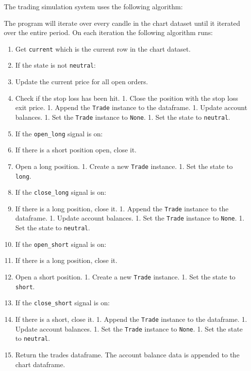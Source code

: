 \documentclass[11pt]{article}
\begin{document}
    The trading simulation system uses the following algorithm:

The program will iterate over every candle in the chart dataset until it
iterated over the entire period. On each iteration the following
algorithm runs:

\begin{enumerate}
\def\labelenumi{\arabic{enumi}.}
\item
  Get \texttt{current} which is the current row in the chart dataset.
\item
  If the state is not \texttt{neutral}:
\item
  Update the current price for all open orders.
\item
  Check if the stop loss has been hit. 1. Close the position with the
  stop loss exit price. 1. Append the \texttt{Trade} instance to the
  dataframe. 1. Update account balances. 1. Set the \texttt{Trade}
  instance to \texttt{None}. 1. Set the state to \texttt{neutral}.
\item
  If the \texttt{open\_long} signal is on:
\item
  If there is a short position open, close it.
\item
  Open a long position. 1. Create a new \texttt{Trade} instance. 1. Set
  the state to \texttt{long}.
\item
  If the \texttt{close\_long} signal is on:
\item
  If there is a long position, close it. 1. Append the \texttt{Trade}
  instance to the dataframe. 1. Update account balances. 1. Set the
  \texttt{Trade} instance to \texttt{None}. 1. Set the state to
  \texttt{neutral}.
\item
  If the \texttt{open\_short} signal is on:
\item
  If there is a long position, close it.
\item
  Open a short position. 1. Create a new \texttt{Trade} instance. 1. Set
  the state to \texttt{short}.
\item
  If the \texttt{close\_short} signal is on:
\item
  If there is a short, close it. 1. Append the \texttt{Trade} instance
  to the dataframe. 1. Update account balances. 1. Set the
  \texttt{Trade} instance to \texttt{None}. 1. Set the state to
  \texttt{neutral}.
\item
  Return the trades dataframe. The account balance data is appended to
  the chart dataframe.
\end{enumerate}
\end{document}
